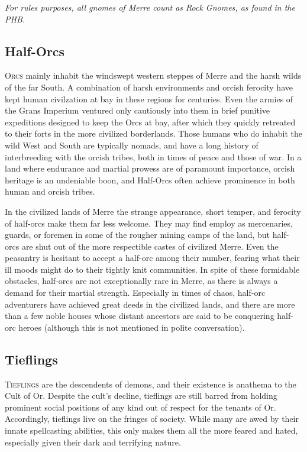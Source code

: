 \documentclass[paper=a4, fontsize=11pt]{scrartcl} %
\begin{document}
\begin{multicols}{2}
\textit{For rules purposes, all gnomes of Merre count as Rock Gnomes, as found in the PHB.}

\subsection{Half-Orcs}

\lettrine[lines=2]{\medievalsharp O}{rcs} mainly inhabit the windswept western steppes of Merre and the harsh wilds of the far South. A combination of harsh environments and orcish ferocity have kept human civilzation at bay in these regions for centuries. Even the armies of the Grans Imperium ventured only cautiously into them in brief punitive expeditions designed to keep the Orcs at bay, after which they quickly retreated to their forts in the more civilized borderlands. Those humans who do inhabit the wild West and South are typically nomads, and have a long history of interbreeding with the orcish tribes, both in times of peace and those of war. In a land where endurance and martial prowess are of paramount importance, orcish heritage is an undeniable boon, and Half-Orcs often achieve prominence in both human and orcish tribes.

In the civilized lands of Merre the strange appearance, short temper, and ferocity of half-orcs make them far less welcome. They may find employ as mercenaries, guards, or foremen in some of the rougher mining camps of the land, but half-orcs are shut out of the more respectible castes of civilized Merre. Even the peasantry is hesitant to accept a half-orc among their number, fearing what their ill moods might do to their tightly knit communities. In spite of these formidable obstacles, half-orcs are not exceptionally rare in Merre, as there is always a demand for their martial strength. Especially in times of chaos, half-orc adventurers have achieved great deeds in the civilized lands, and there are more than a few noble houses whose distant ancestors are said to be conquering half-orc heroes (although this is not mentioned in polite conversation). 

\subsection{Tieflings}

\lettrine[lines=2]{\medievalsharp T}{ieflings} are the descendents of demons, and their existence is anathema to the Cult of Or. Despite the cult's decline, tieflings are still barred from holding prominent social positions of any kind out of respect for the tenants of Or. Accordingly, tieflings live on the fringes of society. While many are awed by their innate spellcasting abilities, this only makes them all the more feared and hated, especially given their dark and terrifying nature. 


\end{multicols}
\end{document}

